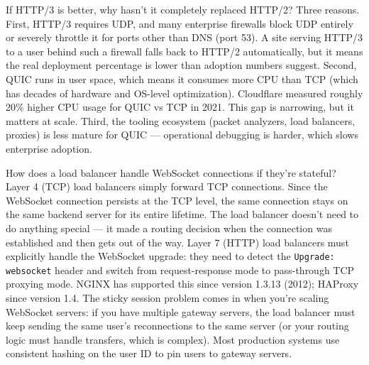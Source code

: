 \documentclass[11pt,a4paper]{article}
\begin{document}
\begin{curiobox}{If HTTP/3 is better, why hasn't it completely replaced HTTP/2?}
Three reasons. First, HTTP/3 requires UDP, and many enterprise firewalls block UDP entirely or severely throttle it for ports other than DNS (port 53). A site serving HTTP/3 to a user behind such a firewall falls back to HTTP/2 automatically, but it means the real deployment percentage is lower than adoption numbers suggest. Second, QUIC runs in user space, which means it consumes more CPU than TCP (which has decades of hardware and OS-level optimization). Cloudflare measured roughly 20\% higher CPU usage for QUIC vs TCP in 2021. This gap is narrowing, but it matters at scale. Third, the tooling ecosystem (packet analyzers, load balancers, proxies) is less mature for QUIC --- operational debugging is harder, which slows enterprise adoption.
\end{curiobox}

\vspace{6pt}

\begin{curiobox}{How does a load balancer handle WebSocket connections if they're stateful?}
Layer 4 (TCP) load balancers simply forward TCP connections. Since the WebSocket connection persists at the TCP level, the same connection stays on the same backend server for its entire lifetime. The load balancer doesn't need to do anything special --- it made a routing decision when the connection was established and then gets out of the way. Layer 7 (HTTP) load balancers must explicitly handle the WebSocket upgrade: they need to detect the \texttt{Upgrade: websocket} header and switch from request-response mode to pass-through TCP proxying mode. NGINX has supported this since version 1.3.13 (2012); HAProxy since version 1.4. The sticky session problem comes in when you're scaling WebSocket servers: if you have multiple gateway servers, the load balancer must keep sending the same user's reconnections to the same server (or your routing logic must handle transfers, which is complex). Most production systems use consistent hashing on the user ID to pin users to gateway servers.
\end{curiobox}

\vspace{6pt}
\end{document}

